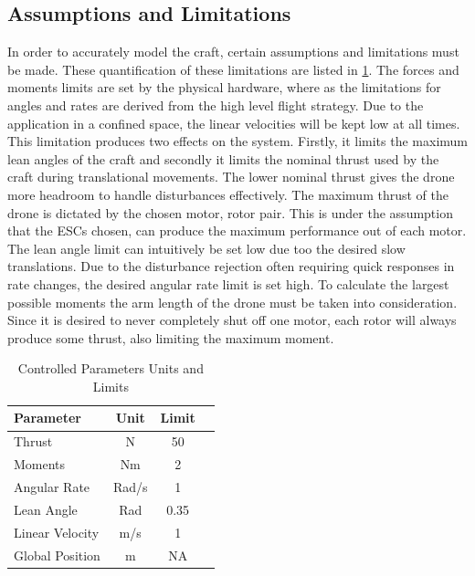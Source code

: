 		\subsection{Assumptions and Limitations}
		In order to accurately model the craft, certain assumptions and limitations must be made. These quantification of these limitations are listed in \ref{TAB_UnitsLimits}. The forces and moments limits are set by the physical hardware, where as the limitations for angles and rates are derived from the high level flight strategy. 
		Due to the application in a confined space, the linear velocities will be kept low at all times. This limitation produces two effects on the system. Firstly, it limits the maximum lean angles of the craft and secondly it limits the nominal thrust used by the craft during translational movements. The lower nominal thrust gives the drone more headroom to handle disturbances effectively. The maximum thrust of the drone is dictated by the chosen motor, rotor pair. This is under the assumption that the ESCs chosen, can produce the maximum performance out of each motor. 
		The lean angle limit can intuitively be set low due too the desired slow translations. Due to the disturbance rejection often requiring quick responses in rate changes, the desired angular rate limit is set high.
		To calculate the largest possible moments the arm length of the drone must be taken into consideration. Since it is desired to never completely shut off one motor, each rotor will always produce some thrust, also limiting the maximum moment.
		
		\begin{table}[!]
			\centering
			\begin{tabular}{l | c | c | c |}
				Parameter & Unit & Limit\\
				\hline\hline
				Thrust					& N 	& 50\\
				Moments					& Nm 	& 2\\
				Angular Rate 	   		& Rad/s & 1\\
				Lean Angle	    		& Rad 	& 0.35\\ %
				Linear Velocity 	  	& m/s 	& 1\\
				Global Position  		& m 	& NA\\
			\end{tabular}
			\label{TAB_UnitsLimits}
			\caption{Controlled Parameters Units and Limits}
		\end{table}
			
